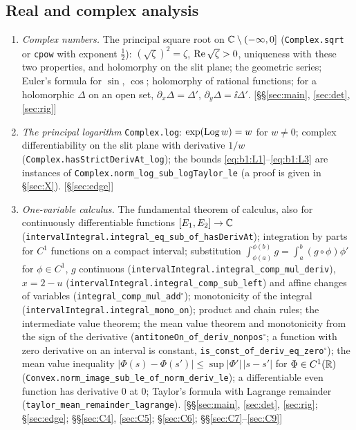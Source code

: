\subsection{Real and complex analysis}
\begin{enumerate}[leftmargin=2em,itemsep=1pt]\raggedright
\item \emph{Complex numbers.} The principal square root on $\mathbb{C}\setminus(-\infty,0]$ (\texttt{Complex.sqrt} or \texttt{cpow} with exponent $\frac12$): $(\sqrt\zeta)^2=\zeta$, $\operatorname{Re}\sqrt\zeta>0$, uniqueness with these two
properties, and holomorphy on the slit plane; the geometric series; Euler's formula for $\sin$, $\cos$; holomorphy of rational functions; for a holomorphic $\Delta$ on an open set,
$\partial_x\Delta=\Delta'$, $\partial_y\Delta=\ii\Delta'$. \hfill[\S\S\ref{sec:main}, \ref{sec:det}, \ref{sec:rig}]
\item \emph{The principal logarithm} \texttt{Complex.log}: $\exp(\operatorname{Log} w)=w$ for $w\ne0$; complex differentiability on the slit plane with derivative $1/w$ (\texttt{Complex.hasStrictDerivAt\_log});
the bounds \eqref{eq:b1:L1}--\eqref{eq:b1:L3} are instances of \texttt{Complex.norm\_log\_sub\_logTaylor\_le} (a proof is given in \S\ref{sec:X}). \hfill[\S\ref{sec:edge}]
\item \emph{One-variable calculus.} The fundamental theorem of calculus, also for continuously differentiable functions $[E_1,E_2]\to\mathbb{C}$ (\texttt{intervalIntegral.integral\_eq\_sub\_of\_hasDerivAt});
integration by parts for $C^1$ functions on a compact interval; substitution $\int_{\phi(a)}^{\phi(b)}g=\int_a^b(g\circ\phi)\phi'$ for $\phi\in C^1$, $g$ continuous (\texttt{intervalIntegral.integral\_comp\_mul\_deriv}),
$x=2-u$ (\texttt{intervalIntegral.integral\_comp\_sub\_left}) and affine changes of variables (\texttt{integral\_comp\_mul\_add}$^\circ$); monotonicity of the integral (\texttt{intervalIntegral.integral\_mono\_on});
product and chain rules; the intermediate value theorem; the mean value theorem and monotonicity from the sign of the derivative (\texttt{antitoneOn\_of\_deriv\_nonpos}$^\circ$; a function with zero
derivative on an interval is constant, \texttt{is\_const\_of\_deriv\_eq\_zero}$^\circ$); the mean value inequality $|\Phi(s)-\Phi(s')|\le\sup|\Phi'|\,|s-s'|$ for $\Phi\in C^1(\mathbb{R})$
(\texttt{Convex.norm\_image\_sub\_le\_of\_norm\_deriv\_le}); a differentiable even function has derivative $0$ at $0$; Taylor's formula with Lagrange remainder (\texttt{taylor\_mean\_remainder\_lagrange}).
\hfill[\S\S\ref{sec:main}, \ref{sec:det}, \ref{sec:rig}; \S\ref{sec:edge}; \S\S\ref{sec:C4}, \ref{sec:C5}; \S\ref{sec:C6}; \S\S\ref{sec:C7}--\ref{sec:C9}]

\end{enumerate}
